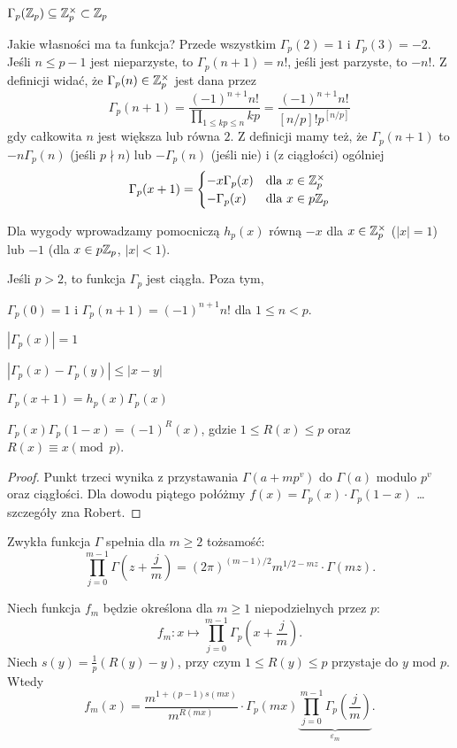 \begin{lemat}
	$\Gamma_p(\mathbb Z_p) \subseteq \mathbb Z_p^\times \subset \mathbb Z_p$
\end{lemat}

Jakie  własności ma ta funkcja? Przede wszystkim $\Gamma_p(2) =1$ i $\Gamma_p(3) = -2$.
Jeśli $n \le p-1$ jest nieparzyste, to $\Gamma_p(n+1) = n!$, jeśli jest parzyste, to $-n!$.
Z definicji widać, że $\Gamma_p(n) \in \mathbb Z_p^\times$ jest dana przez
\[
	\Gamma_p(n+1) = \frac{(-1)^{n+1}n!}{\prod_{1 \le kp \le n} kp} = \frac{(-1)^{n+1}n!}{[n/p]! p^{[n/p]}}
\]
gdy całkowita $n$ jest większa lub równa $2$.
Z definicji mamy też, że $\Gamma_p(n+1)$ to $-n \Gamma_p(n)$ (jeśli $p \nmid n$) lub $-\Gamma_p(n)$ (jeśli nie) i (z ciągłości) ogólniej
\[
	\Gamma_p(x+1) = \begin{cases}
		-x \Gamma_p(x) & \text{dla } x \in \mathbb Z_p^\times \\
		-\Gamma_p(x) & \text{dla } x \in p\mathbb Z_p
	\end{cases}
\]

Dla wygody wprowadzamy pomocniczą $h_p(x)$ równą $-x$ dla $x \in \mathbb Z_p^\times$ ($|x|=1$) lub $-1$ (dla $x \in p\mathbb Z_p$, $|x|<1$).

\begin{fakt}
	\label{impuls}
	Jeśli $p > 2$, to funkcja $\Gamma_p$ jest ciągła.
	Poza tym,
	\begin{enumx}
		\item $\Gamma_p(0) = 1$ i $\Gamma_p(n+1) = (-1)^{n+1}n!$ dla $1 \le n < p$.
		\item $|\Gamma_p(x)| = 1$
		\item $|\Gamma_p(x) - \Gamma_p(y)| \le |x-y|$
		\item $\Gamma_p(x+1) = h_p(x) \Gamma_p(x)$
		\item $\Gamma_p(x) \Gamma_p(1-x) = (-1)^R(x)$, gdzie $1 \le R(x) \le p$ oraz $R(x) \equiv x \pmod p$.
	\end{enumx}
\end{fakt}

\begin{proof}
Punkt trzeci wynika z przystawania $\Gamma(a + mp^v)$ do $\Gamma(a)$ modulo $p^v$ oraz ciągłości.
Dla dowodu piątego połóżmy $f(x) = \Gamma_p(x) \cdot \Gamma_p(1-x)$ \dots szczegóły zna Robert.
\end{proof}

Zwykła funkcja $\Gamma$ spełnia dla $m\ge 2$ tożsamość:
\[
	\prod_{j=0}^{m-1} \Gamma \left(z + \frac jm\right) = (2\pi)^{(m-1)/2} m^{1/2-mz} \cdot \Gamma (mz).
\]

\begin{fakt}
	Niech funkcja $f_m$ będzie określona dla  $m \ge 1$ niepodzielnych przez $p$:
	\[
		f_m \colon x \mapsto \prod_{j = 0}^{m - 1} \Gamma_p \left(x + \frac j m \right).
	\]
	Niech $s(y) = \frac 1 p (R(y) -y)$, przy czym $1 \le R(y) \le p$ przystaje do $y$ mod $p$.
	Wtedy
	\[
		f_m(x) = \frac{m^{1 + (p-1)s(mx)}}{m^{R(mx)}} \cdot \Gamma_p(mx) \underbrace{\prod_{j=0}^{m-1} \Gamma_p\left(\frac jm\right)}_{\varepsilon_m}.
	\]
\end{fakt}

